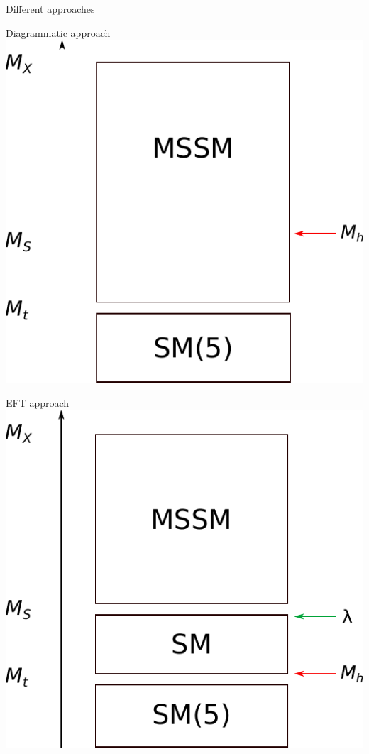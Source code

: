 \documentclass[hyperref={pdfpagelabels=false},ngerman]{beamer}
\begin{document}

\begin{frame}{Different approaches}
  \begin{minipage}[t]{0.45\textwidth}
    \centering
    Diagrammatic approach\\[1em]
    \includegraphics[width=\textwidth]{images/mssm-sm-tower-diagrammatic}
  \end{minipage}
  \hfill
  \begin{minipage}[t]{0.45\textwidth}
    \centering
    EFT approach\\[1em]
    \includegraphics[width=\textwidth]{images/mssm-sm-tower-eft}
  \end{minipage}
\end{frame}
\end{document}
